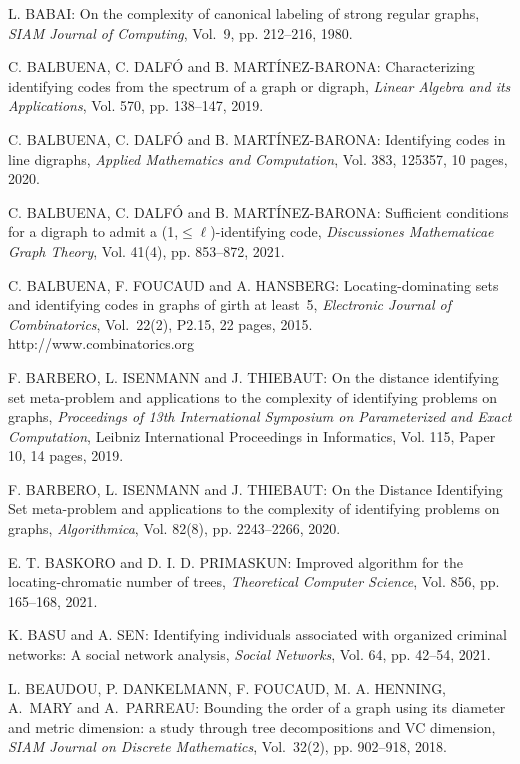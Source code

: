 \begin{thebibliography}{999}
L. BABAI: On the complexity of canonical labeling of strong regular graphs, {\it SIAM Journal of Computing}, Vol.~9, pp. 212--216, 1980.

C. BALBUENA, C. DALF\'O and B. MART\'INEZ-BARONA: Characterizing identifying codes from the spectrum of a graph or digraph, {\it Linear Algebra and its Applications}, Vol. 570, pp. 138--147, 2019.

C. BALBUENA, C. DALF\'O and B. MART\'INEZ-BARONA: Identifying codes in line digraphs, {\it Applied Mathematics and Computation}, Vol. 383, 125357, 10 pages, 2020.

C. BALBUENA, C. DALF\'O and B. MART\'INEZ-BARONA: Sufficient conditions for a digraph to admit a (1,$\leq \ell$)-identifying code, {\it Discussiones Mathematicae Graph Theory}, Vol. 41(4), pp. 853--872, 2021.

C. BALBUENA, F. FOUCAUD and A. HANSBERG: Locating-dominating sets and identifying codes in graphs of girth at least~5, {\it Electronic Journal of Combinatorics}, Vol.~22(2), P2.15, 22 pages, 2015.\\
http://www.combinatorics.org

F. BARBERO, L. ISENMANN and J. THIEBAUT: On the distance identifying set meta-problem and applications to the complexity of identifying problems on graphs, {\it Proceedings of 13th International Symposium on Parameterized and Exact Computation}, Leibniz International Proceedings in Informatics, Vol. 115, Paper 10, 14 pages, 2019.

F. BARBERO, L. ISENMANN and J. THIEBAUT: On the Distance Identifying Set meta-problem and applications to the complexity of identifying problems on graphs, {\it Algorithmica}, Vol. 82(8), pp. 2243--2266, 2020.

E. T. BASKORO and D. I. D. PRIMASKUN: Improved algorithm for the locating-chromatic number of trees, {\it Theoretical Computer Science}, Vol. 856, pp. 165--168, 2021.

K. BASU and A. SEN: Identifying individuals associated with organized criminal networks: A social network analysis, {\it Social Networks}, Vol. 64, pp. 42--54, 2021.

L. BEAUDOU, P. DANKELMANN, F. FOUCAUD, M. A. HENNING, A.~MARY and A.~PARREAU: Bounding the order of a graph using its diameter and metric dimension: a study through tree decompositions and VC dimension, {\it SIAM Journal on Discrete Mathematics}, Vol.~32(2), pp. 902--918, 2018.


\end{thebibliography}
